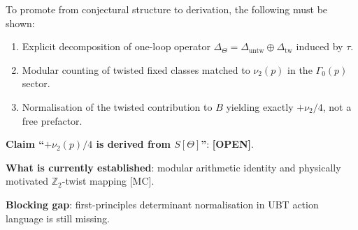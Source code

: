 \documentclass[12pt,a4paper]{article}
\begin{document}
To promote from conjectural structure to derivation, the following must be shown:
\begin{enumerate}
  \item Explicit decomposition of one-loop operator
    \(\Delta_\Theta = \Delta_{\mathrm{untw}} \oplus \Delta_{\mathrm{tw}}\)
    induced by \(\tau\).
  \item Modular counting of twisted fixed classes matched to
    \(\nu_2(p)\) in the \(\Gamma_0(p)\) sector.
  \item Normalisation of the twisted contribution to \(B\) yielding exactly
    \(+\nu_2/4\), not a free prefactor.
\end{enumerate}

\begin{statusbox}
\textbf{Claim ``\(+\nu_2(p)/4\) is derived from \(S[\Theta]\)''}: \textbf{[OPEN]}.

\textbf{What is currently established}: modular arithmetic identity and physically
motivated \(\mathbb{Z}_2\)-twist mapping [MC].

\textbf{Blocking gap}: first-principles determinant normalisation in UBT action
language is still missing.
\end{statusbox}

\ifdefined\INCLUDEMODE
\else
  
\end{document}

